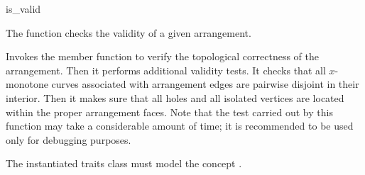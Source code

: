 \ccRefPageBegin

\begin{ccRefFunction}{is_valid}

\ccDefinition

The function \ccRefName{} checks the validity of a given arrangement.



Invokes the member function  to verify the
topological correctness of the arrangement. Then it performs additional
validity tests. It checks that all $x$-monotone curves associated with
arrangement edges are pairwise disjoint in their interior. Then it makes
sure that all holes and all isolated vertices are located within the
proper arrangement faces. Note that the test carried out by this
function may take a considerable amount of time; it is recommended to be
used only for debugging purposes.

\ccRequirements
The instantiated traits class must model the concept
. 

\end{ccRefFunction}

\ccRefPageEnd
